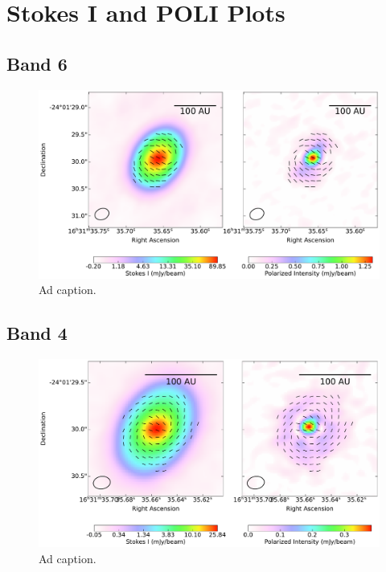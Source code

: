 \chapter{Stokes I and POLI Plots}
\label{ch2}

\section{Band 6}
\begin{figure}[h]
  \centering
  \includegraphics[width=2\textwidth]{WRITEUP_AND_IMAGES/IMAGES/IRS63_StokesI_POLI_vectors_BAND6.pdf}
  \caption{Ad caption.}
  \label{fig: }
\end{figure}

\section{Band 4}
\begin{figure}[h]
  \centering
  \includegraphics[width=2\textwidth]{WRITEUP_AND_IMAGES/IMAGES/IRS63_StokesI_POLI_vectors_BAND4.pdf}
  \caption{Ad caption.}
  \label{fig: }
\end{figure}
